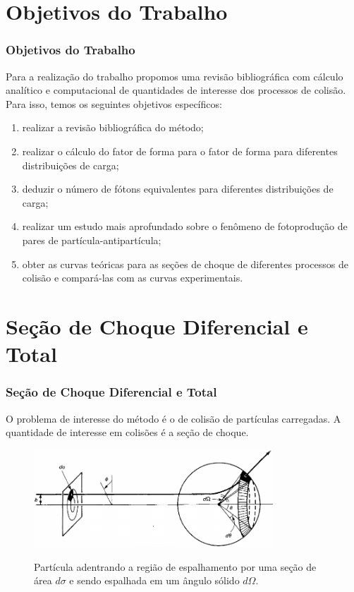 \documentclass[xcolor=dvipsnames]{beamer}
\begin{document}
\section{Objetivos do Trabalho}
\begin{frame}
	\frametitle{Objetivos do Trabalho}
	Para a realização do trabalho propomos uma revisão bibliográfica com cálculo
	analítico e computacional de quantidades de interesse dos processos de
	colisão. Para isso, temos os seguintes objetivos específicos:
	\begin{enumerate}
		\item realizar a revisão bibliográfica do método;
		\item realizar o cálculo do fator de forma para o fator de forma
			para diferentes distribuições de carga;
		\item deduzir o número de fótons equivalentes para diferentes
			distribuições de carga;
		\item realizar um estudo mais aprofundado sobre o fenômeno de
			fotoprodução de pares de partícula-antipartícula;
		\item obter as curvas teóricas para as seções de choque de diferentes
			processos de colisão e compará-las com as curvas experimentais.
	\end{enumerate}

\end{frame}

\section{Seção de Choque Diferencial e Total}
\begin{frame}
	\frametitle{Seção de Choque Diferencial e Total}

	O problema de interesse do método é o de colisão de partículas carregadas.
	A quantidade de interesse em colisões é a seção de choque.

	\begin{figure}[h]
		\centering
		\includegraphics[width=0.8\textwidth]{./figs/cross_section.jpeg}
		\label{fig_cross_section}
		\caption{Partícula adentrando a região de espalhamento por uma
		seção de área $d\sigma$ e  sendo espalhada em um ângulo sólido
		$d\Omega$.}
	\end{figure}
\end{frame}
\end{document}
